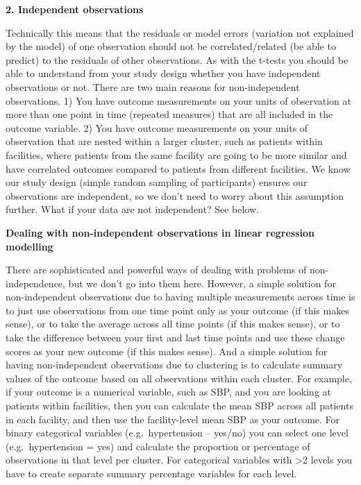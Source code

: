 \documentclass[
]{book}
\begin{document}
\textbf{2. Independent observations}

Technically this means that the residuals or model errors (variation not explained by the model) of one observation should not be correlated/related (be able to predict) to the residuals of other observations. As with the t-tests you should be able to understand from your study design whether you have independent observations or not. There are two main reasons for non-independent observations. 1) You have outcome measurements on your units of observation at more than one point in time (repeated measures) that are all included in the outcome variable. 2) You have outcome measurements on your units of observation that are nested within a larger cluster, such as patients within facilities, where patients from the same facility are going to be more similar and have correlated outcomes compared to patients from different facilities. We know our study design (simple random sampling of participants) ensures our observations are independent, so we don't need to worry about this assumption further. What if your data are not independent? See below.

\textbf{Dealing with non-independent observations in linear regression modelling}

There are sophisticated and powerful ways of dealing with problems of non-independence, but we don't go into them here. However, a simple solution for non-independent observations due to having multiple measurements across time is to just use observations from one time point only as your outcome (if this makes sense), or to take the average across all time points (if this makes sense), or to take the difference between your first and last time points and use these change scores as your new outcome (if this makes sense). And a simple solution for having non-independent observations due to clustering is to calculate summary values of the outcome based on all observations within each cluster. For example, if your outcome is a numerical variable, such as SBP, and you are looking at patients within facilities, then you can calculate the mean SBP across all patients in each facility, and then use the facility-level mean SBP as your outcome. For binary categorical variables (e.g.~hypertension -- yes/no) you can select one level (e.g.~hypertension = yes) and calculate the proportion or percentage of observations in that level per cluster. For categorical variables with \textgreater2 levels you have to create separate summary percentage variables for each level.
\end{document}
